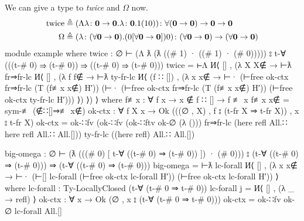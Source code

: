 \documentclass[logo,bsc,singlespacing,parskip,online]{infthesis}
\renewenvironment{code}{\mintedcopy[breaklines,breaksymbolleft=\;]{agda}}{\endmintedcopy}
\begin{document}
We can give a type to \textit{twice} and $\Omega$ now.
\begin{align}
\label{equation:twice_big_omega}
  \text{twice} &\triangleq (\Lambda \lambda \colon \mathbf{0} \to \mathbf{0}. \lambda \colon \mathbf{0}. 1(10))
    \colon \forall (\mathbf{0} \to \mathbf{0}) \to \mathbf{0} \to \mathbf{0}\\
  \Omega &\triangleq (\lambda \colon (\forall \mathbf{0} \to \mathbf{0}). (0 [\forall \mathbf{0} \to \mathbf{0}]) 0)
    \colon (\forall \mathbf{0} \to \mathbf{0}) \to (\forall \mathbf{0} \to \mathbf{0}) \notag
\end{align}
\begin{code}
  module example where
    twice : ∅ ⊢ (Λ ƛ (ƛ ((# 1) · ((# 1) · (# 0)))))
        ⦂ t-∀ (((t-# 0) ⇒ (t-# 0))
          ⇒ ((t-# 0) ⇒ (t-# 0)))
    twice = ⊢Λ И⟨ [] , (λ X {X∉} → ⊢ƛ fr⇒fr-lc И⟨ [] , (λ f {f∉} →
      ⊢ƛ ty-fr-lc И⟨ (f ∷ []) , (λ x {x∉} → ⊢·
        (⊢free ok-ctx fr⇒fr-lc (T (f≢x x∉) H′))
        (⊢· (⊢free ok-ctx fr⇒fr-lc (T (f≢x x∉) H′)) (⊢free ok-ctx ty-fr-lc H′))) ⟩) ⟩) ⟩
      where
        f≢x : ∀ {f x} → x ∉ f ∷ [] → f ≢ x
        f≢x x∉ = sym-≢ (∉∷[]⇒≢ x∉)
        ok-ctx : ∀ {f X x} → Ok (((∅ , X) , f ⦂ (t-fr X ⇒ t-fr X)) , x ⦂ t-fr X)
        ok-ctx = ok-∷fv
                   (ok-∷fv (ok-∷ftv ok-∅ (λ ()))
                     fr⇒fr-lc
                     (here refl All.∷ here refl All.∷ All.[]))
                   ty-fr-lc
                   ((here refl) All.∷ All.[])

    big-omega : ∅ ⊢ (ƛ (((# 0) [ t-∀ ((t-# 0) ⇒ (t-# 0)) ]) · (# 0)))
        ⦂ (t-∀ ((t-# 0) ⇒ (t-# 0)))
          ⇒ (t-∀ ((t-# 0) ⇒ (t-# 0)))
    big-omega =
      ⊢ƛ lc-forall И⟨ [] , (λ x {x∉} → ⊢· (⊢[] lc-forall (⊢free ok-ctx lc-forall H′)) (⊢free ok-ctx lc-forall H′)) ⟩
        where
          lc-forall : Ty-LocallyClosed (t-∀ (t-# 0 ⇒ t-# 0))
          lc-forall j = И⟨ [] , (λ _ → refl) ⟩
          ok-ctx : ∀ {x} →  Ok (∅ , x ⦂ (t-∀ (t-# 0 ⇒ t-# 0)))
          ok-ctx = ok-∷fv ok-∅ lc-forall All.[]
\end{code}
\end{document}
